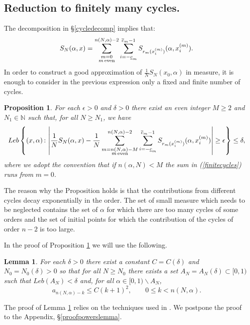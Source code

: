 \documentclass{conm-p-l}
\numberwithin{equation}{section}
\newtheorem{lemma}[theorem]{Lemma}
\newtheorem{prop}[theorem]{Proposition}
\begin{document}
\subsection{Reduction to finitely many cycles.}\label{finitelymany}
The decomposition in \S\ref{cycledecomp} implies that:
\begin{equation}\label{BSdecomp}
 {S_{{N}}({\alpha}, {{x}})} =  \sum_{\begin{subarray}{c}{{m=0}}\\{m \, \mathrm{even}}\end{subarray}}^{n(N,\alpha)-2} \sum_{i=-\underline{c}_m}^{\overline{c}_m-1}  {S_{{r_{m}({x}^{(m)}_i)}}({\alpha}, {{x}^{(m)}_i})}.
\end{equation}
In order to construct a good approximation of $\frac{1}{N}{S_{{N}}({x_0}, {\alpha})}$ in measure, it is enough to consider in the previous expression only a fixed and finite number of cycles.
\begin{prop}\label{finitecycleslemma}
For each $\epsilon>0$ and $\delta>0$  there exist an even integer $M\geq 2$ and $N_1\in \mathbb{N}$ such that, for all $N\geq N_1$, we have
\begin{equation}\label{finitecycles}
Leb \left\{ (x ,\alpha ) {\, : \, } \left| \frac{1}{N}  {S_{{N}}({\alpha}, {{x}})} -   \frac{1}{N} \sum_{\begin{subarray}{c}{{m=n(N,\alpha)-M}}\\{m \, \mathrm{even}}\end{subarray}}^{n(N,\alpha)-2} \sum_{i=-\underline{c}_m}^{\overline{c}_m-1}  {S_{{r_{m}({x}^{(m)}_i)}}({\alpha}, {{x}^{(m)}_i})}
 \right| \geq \epsilon \right\} \leq \delta,
\end{equation}
where we adopt the convention that if $n(\alpha,N)<M$ the sum in  (\ref{finitecycles}) runs from $m=0$. 
\end{prop}
The reason why the Proposition holds is that the contributions from different cycles decay exponentially in the order.  The set of small measure which needs to be neglected contains the set of $\alpha$ for which there are too many cycles of some orders and the set of initial points for which the contribution of the cycles of order $n-2$ is too large.

In the proof of Proposition \ref{finitecycleslemma} we will use the following.
\begin{lemma}\label{powerslemma}
For each $\delta>0$ there exist a constant $C=C(\delta)$ and $N_0 = N_0 (\delta)> 0 $  so that for all $N\geq N_0$ there exists a set $A_N=A_N(\delta)\subset [0,1)$ such that $Leb(A_N)< \delta $ and, for all $\alpha \in [0,1)\backslash A_N$, 
\begin{equation}\label{apowers}
a_{n(N,\alpha)-k} \leq C (k+1)^2 , \qquad  0\leq k < n(N,\alpha).
\end{equation}
\end{lemma}
The proof of Lemma \ref{powerslemma} relies on the techniques used in \cite{SU:ren}. We postpone the proof to the Appendix, \S\ref{proofpowerslemma}.
\end{document}
